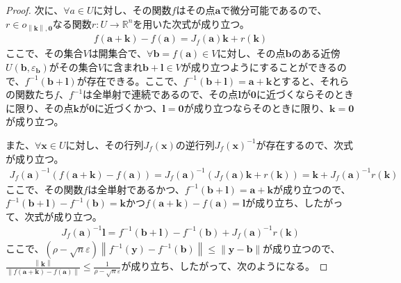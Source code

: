 \documentclass[dvipdfmx]{jsarticle}
\begin{document}
\begin{proof}
次に、$\forall a \in U$に対し、その関数$f$はその点$\mathbf{a}$で微分可能であるので、$r \in o_{\left\| \mathbf{k} \right\|,\mathbf{0}}$なる関数$r:U \rightarrow \mathbb{R}^{n}$を用いた次式が成り立つ。
\begin{align*}
f\left( \mathbf{a} + \mathbf{k} \right) - f\left( \mathbf{a} \right) = J_{f}\left( \mathbf{a} \right)\mathbf{k} + r\left( \mathbf{k} \right)
\end{align*}
ここで、その集合$V$は開集合で、$\forall\mathbf{b} = f\left( \mathbf{a} \right) \in V$に対し、その点$\mathbf{b}$のある近傍$U\left( \mathbf{b},\varepsilon_{\mathbf{b}} \right)$がその集合$V$に含まれ$\mathbf{b} + \mathbf{l} \in V$が成り立つようにすることができるので、$f^{- 1}\left( \mathbf{b} + \mathbf{l} \right)$が存在できる。ここで、$f^{- 1}\left( \mathbf{b} + \mathbf{l} \right) = \mathbf{a} + \mathbf{k}$とすると、それらの関数たち$f$、$f^{- 1}$は全単射で連続であるので、その点$\mathbf{l}$が$\mathbf{0}$に近づくならそのときに限り、その点$\mathbf{k}$が$\mathbf{0}$に近づくかつ、$\mathbf{l} = \mathbf{0}$が成り立つならそのときに限り、$\mathbf{k} = \mathbf{0}$が成り立つ。\par
また、$\forall\mathbf{x} \in U$に対し、その行列$J_{f}\left( \mathbf{x} \right)$の逆行列$J_{f}\left( \mathbf{x} \right)^{- 1}$が存在するので、次式が成り立つ。
\begin{align*}
J_{f}\left( \mathbf{a} \right)^{- 1}\left( f\left( \mathbf{a} + \mathbf{k} \right) - f\left( \mathbf{a} \right) \right) = J_{f}\left( \mathbf{a} \right)^{- 1}\left( J_{f}\left( \mathbf{a} \right)\mathbf{k} + r\left( \mathbf{k} \right) \right) = \mathbf{k} + J_{f}\left( \mathbf{a} \right)^{- 1}r\left( \mathbf{k} \right)
\end{align*}
ここで、その関数$f$は全単射であるかつ、$f^{- 1}\left( \mathbf{b} + \mathbf{l} \right) = \mathbf{a} + \mathbf{k}$が成り立つので、$f^{- 1}\left( \mathbf{b} + \mathbf{l} \right) - f^{- 1}\left( \mathbf{b} \right) = \mathbf{k}$かつ$f\left( \mathbf{a} + \mathbf{k} \right) - f\left( \mathbf{a} \right) = \mathbf{l}$が成り立ち、したがって、次式が成り立つ。
\begin{align*}
J_{f}\left( \mathbf{a} \right)^{- 1}\mathbf{l} = f^{- 1}\left( \mathbf{b} + \mathbf{l} \right) - f^{- 1}\left( \mathbf{b} \right) + J_{f}\left( \mathbf{a} \right)^{- 1}r\left( \mathbf{k} \right)
\end{align*}
ここで、$\left( \rho - \sqrt{n}\varepsilon \right)\left\| f^{- 1}\left( \mathbf{y} \right) - f^{- 1}\left( \mathbf{b} \right) \right\| \leq \left\| \mathbf{y} - \mathbf{b} \right\|$が成り立つので、$\frac{\left\| \mathbf{k} \right\|}{\left\| f\left( \mathbf{a} + \mathbf{k} \right) - f\left( \mathbf{a} \right) \right\|} \leq \frac{1}{\rho - \sqrt{n}\varepsilon}$が成り立ち、したがって、次のようになる。

\end{proof}
\end{document}

